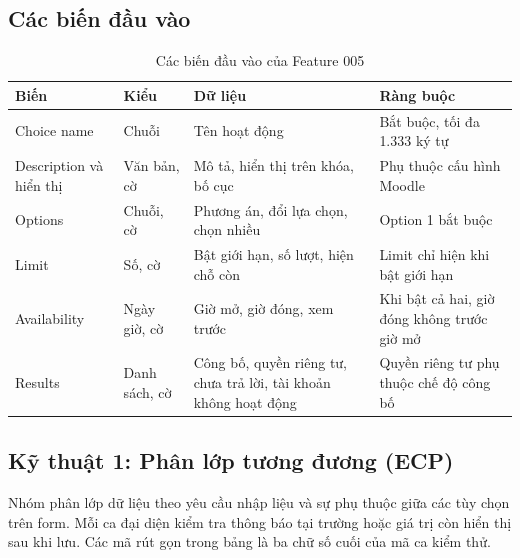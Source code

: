 \subsection{Các biến đầu vào}
\begin{table}[H]
\centering\small
\begin{tabular}{|L{3.2cm}|L{2.1cm}|L{4.4cm}|L{4.3cm}|}
\hline
{}\textbf{Biến} & \textbf{Kiểu} & \textbf{Dữ liệu} & \textbf{Ràng buộc} \\ \hline
Choice name & Chuỗi & Tên hoạt động & Bắt buộc, tối đa 1.333 ký tự \\ \hline
Description và hiển thị & Văn bản, cờ & Mô tả, hiển thị trên khóa, bố cục & Phụ thuộc cấu hình Moodle \\ \hline
Options & Chuỗi, cờ & Phương án, đổi lựa chọn, chọn nhiều & Option 1 bắt buộc \\ \hline
Limit & Số, cờ & Bật giới hạn, số lượt, hiện chỗ còn & Limit chỉ hiện khi bật giới hạn \\ \hline
Availability & Ngày giờ, cờ & Giờ mở, giờ đóng, xem trước & Khi bật cả hai, giờ đóng không trước giờ mở \\ \hline
Results & Danh sách, cờ & Công bố, quyền riêng tư, chưa trả lời, tài khoản không hoạt động & Quyền riêng tư phụ thuộc chế độ công bố \\ \hline
\end{tabular}
\caption{Các biến đầu vào của Feature 005}
\end{table}

\subsection{Kỹ thuật 1: Phân lớp tương đương (ECP)}
Nhóm phân lớp dữ liệu theo yêu cầu nhập liệu và sự phụ thuộc giữa các tùy chọn trên form. Mỗi ca đại diện kiểm tra thông báo tại trường hoặc giá trị còn hiển thị sau khi lưu. Các mã rút gọn trong bảng là ba chữ số cuối của mã ca kiểm thử.


